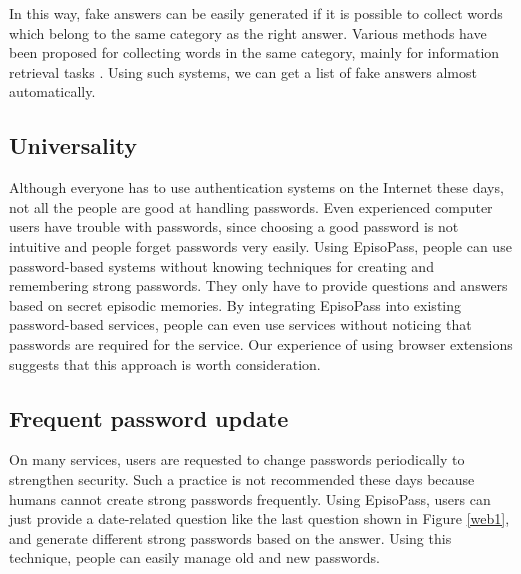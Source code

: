 \documentclass[runningheads,a4paper]{llncs}
\begin{document}
In this way, fake answers can be easily generated
if it is possible to collect words which belong to the same
category as the right answer.
%
Various methods have been proposed for collecting words in the
same category, mainly for information retrieval tasks%
\cite{Huang:2012:LFC:2426725.2426728}%
\cite{BooWa}%
\cite{Wang:2007:LSE:1441428.1442086}.
Using such systems, we can get a list of fake answers almost automatically.

\subsection{Universality}

Although everyone has to use authentication systems on the Internet these days,
not all the people are good at handling passwords.
Even experienced computer users have trouble with passwords,
since choosing a good password is not intuitive and
people forget passwords very easily.
%
Using EpisoPass, people can use password-based systems without knowing
techniques for creating and remembering strong passwords.
They only have to provide
questions and answers based on secret episodic memories.
%
By integrating EpisoPass into existing password-based services,
people can even use services without noticing that passwords are
required for the service.
%
Our experience of using browser extensions suggests that
this approach is worth consideration.

\subsection{Frequent password update}

On many services, users are requested to change passwords periodically
to strengthen security.
%
Such a practice is not recommended these days
because humans cannot create strong passwords frequently\cite{Schneier:change}.
%
%
Using EpisoPass, users can just provide a date-related question
like the last question shown in Figure \ref{web1},
and generate different strong passwords based on the answer.
Using this technique, people can easily manage old and new passwords.
\end{document}
